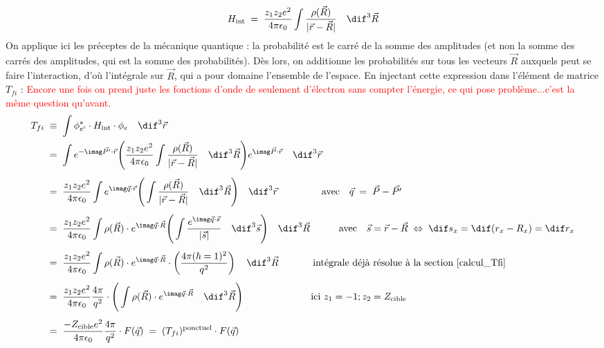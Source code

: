 \[
    H_\text{int} \eq \dfrac{z_1z_2e^2}{4\pi\epsilon_0} \int \dfrac{\rho(\vec{R})}{|\vec{r} - \vec{R}|} \quad \dif^3\vec{R}
\] 
On applique ici les préceptes de la mécanique quantique : la probabilité est le carré de la somme des amplitudes (et non la somme des carrés des amplitudes, qui est la somme des probabilités). Dès lors, on additionne les probabilités sur tous les vecteurs $\vec{R}$ auxquels peut se faire l'interaction, d'où l'intégrale sur $\vec{R}$, qui a pour domaine l'ensemble de l'espace. En injectant cette expression dans l'élément de matrice $T_{fi}$ : \textcolor{red}{Encore une fois on prend juste les fonctions d'onde de seulement d'électron sans compter l'énergie, ce qui pose problème...c'est la même question qu'avant.}
\begin{align*}
    T_{fi} 
&\; \equiv \;
    \int \phi^*_{e'} \cdot H_\text{int} \cdot \phi_e \quad \dif^3\vec{r}\\
&\eq 
    \int 
    e^{-\imag\vec{P'} \cdot\vec{r}}
    \Bigg(
        \dfrac{z_1z_2e^2}{4\pi\epsilon_0} \int \dfrac{\rho(\vec{R})}{|\vec{r} - \vec{R}|} \quad \dif^3\vec{R}
    \Bigg)
    e^{\imag\vec{P} \cdot\vec{r}}
    \quad \dif^3\vec{r}\\[4pt]
& \eq 
    \dfrac{z_1z_2e^2}{4\pi\epsilon_0} \int 
    e^{\imag\vec{q} \cdot\vec{r}}
    \Bigg(
         \int \dfrac{\rho(\vec{R})}{|\vec{r} - \vec{R}|} \quad \dif^3\vec{R}
    \Bigg)
    \quad \dif^3\vec{r}
    \qquad \qquad \;\; \text{avec} \quad \vec{q} \eq \vec{P}-\vec{P'}
    \\[4pt]
& \eq 
    \dfrac{z_1z_2e^2}{4\pi\epsilon_0} \int 
    \rho(\vec{R}) \cdot e^{\imag\vec{q} \cdot\vec{R}}
    \Bigg(
         \int \dfrac{ e^{\imag\vec{q} \cdot\vec{s}}   }{|\vec{s}|} \quad \dif^3\vec{s}
    \Bigg)
    \quad \dif^3\vec{R}
    \qquad \quad \text{avec} \quad \vec{s} = \vec{r}-\vec{R} \; \Leftrightarrow \; \dif s_x = \dif(r_x - R_x) = \dif r_x
    \\[4pt]
& \eq 
    \dfrac{z_1z_2e^2}{4\pi\epsilon_0} \int 
    \rho(\vec{R}) \cdot e^{\imag\vec{q} \cdot\vec{R}}
    \cdot \left( \dfrac{4\pi(\hbar = 1)^2}{q^2} \right)
    \quad \dif^3\vec{R}
    \qquad \quad \;\; \text{intégrale déjà résolue à la section \eqref{calcul_Tfi}}
    \\[4pt]
& \eq 
    \dfrac{z_1z_2e^2}{4\pi\epsilon_0} \dfrac{4\pi}{q^2} \cdot
    \Bigg(
    \int 
    \rho(\vec{R}) \cdot e^{\imag\vec{q} \cdot\vec{R}}
    \quad \dif^3\vec{R}
    \Bigg)
    \qquad \qquad \qquad \quad \text{ici  }  z_1 = -1; z_2 = Z_\text{cible}
    \\[4pt]
& \eq 
    \dfrac{-Z_\text{cible}e^2}{4\pi\epsilon_0} \dfrac{4\pi}{q^2}
    \cdot F(\vec{q})
    \eq
    (T_{fi})^\text{ponctuel} \cdot F(\vec{q})
    \\
\end{align*}
